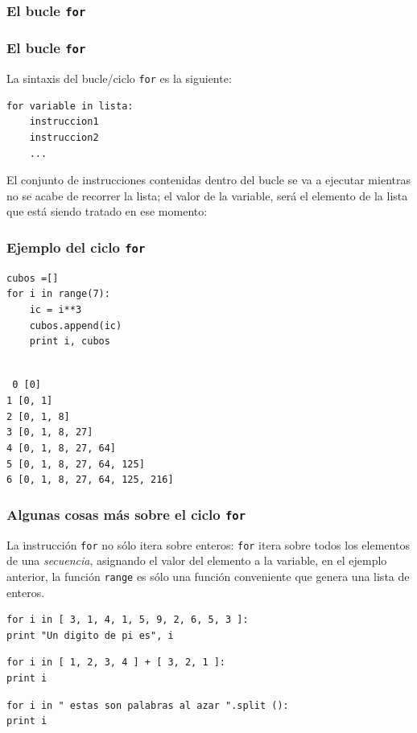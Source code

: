 \subsubsection{El bucle \texttt{for}}
\begin{frame}[fragile]
\frametitle{El bucle \texttt{for}}
La sintaxis del bucle/ciclo \texttt{for} es la siguiente:
\\
\medskip
\begin{verbatim}
for variable in lista:
    instruccion1
    instruccion2
    ...
\end{verbatim}
El conjunto de instrucciones contenidas dentro del bucle se va a ejecutar mientras no se acabe de recorrer la lista; el valor de la variable, será el elemento de la lista que está siendo tratado en ese momento:
\end{frame}
\begin{frame}[fragile]
\frametitle{Ejemplo del ciclo \texttt{for}}
\begin{minipage}{5cm}
\begin{lstlisting}
cubos =[]
for i in range(7):
    ic = i**3
    cubos.append(ic)
    print i, cubos
\end{lstlisting}
\end{minipage}
\pause
\\
\medskip
\texttt{
0 [0] \\
1 [0, 1] \\
2 [0, 1, 8] \\
3 [0, 1, 8, 27] \\
4 [0, 1, 8, 27, 64] \\
5 [0, 1, 8, 27, 64, 125] \\
6 [0, 1, 8, 27, 64, 125, 216]
}
\end{frame}
\begin{frame}[fragile]
\frametitle{Algunas cosas más sobre el ciclo \texttt{for}}
La instrucción \texttt{for} no sólo itera sobre enteros: \texttt{for} itera sobre todos los elementos de una \emph{secuencia}, asignando el valor del elemento a la variable, en el ejemplo anterior, la función \texttt{range} es sólo una función conveniente que genera una lista de enteros.
\begin{verbatim}
for i in [ 3, 1, 4, 1, 5, 9, 2, 6, 5, 3 ]:
print "Un digito de pi es", i
\end{verbatim}
\begin{verbatim}
for i in [ 1, 2, 3, 4 ] + [ 3, 2, 1 ]:
print i
\end{verbatim}
\begin{verbatim}
for i in " estas son palabras al azar ".split ():
print i
\end{verbatim}
\end{frame}
